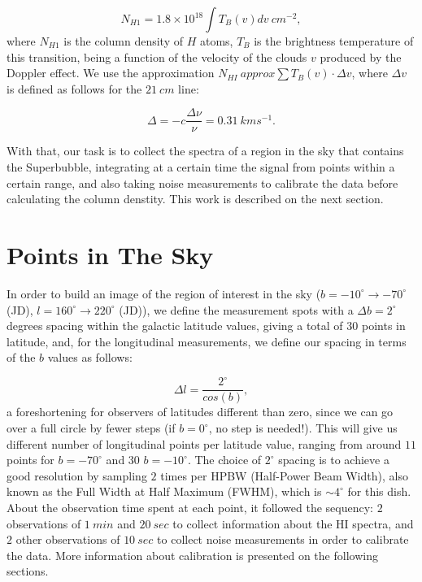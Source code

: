 \documentclass{article}
\begin{document}
\begin{equation}
N_{H1} = 1.8\times10^{18}\int T_{B}(v)dv \  cm^{-2},
\label{eq:tau}
\end{equation}  
where $N_{H1}$ is the column density of $H$ atoms, $T_{B}$ is the
brightness temperature of this transition, being a function of the
velocity of the clouds $v$ produced by the Doppler effect. We use the
approximation $ N_{HI} \ approx \sum T_{B}(v) \cdot \Delta v$, where
$\Delta v$ is defined as follows for the $21 \ cm$ line:

\begin{equation}
\Delta = -c\frac{\Delta \nu}{\nu} = 0.31 \ kms^{-1}.
\label{eq:tau}
\end{equation}  

With that, our task is to collect the spectra of a region in the sky
that contains the Superbubble, integrating at a certain time the signal
from points within a certain range, and also taking noise measurements
to calibrate the data before calculating the column denstity. This work
is described on the next section.

\section{Points in The Sky}

In order to build an image of the region of interest in the sky 
($b = -10^{\circ}  \rightarrow -70^{\circ}$ (JD), $l = 160  ^{\circ}
\rightarrow 220 ^{\circ}$ (JD)), we define the measurement spots with a
$\Delta b = 2^{\circ}$
degrees spacing within the galactic latitude values, giving a total of $30$
points in latitude, and, for the longitudinal measurements, we
define our spacing in terms of the $b$ values as follows:

\begin{equation}
\Delta l = \frac {2^{\circ}}{cos(b)},
\label{eq:tau}
\end{equation}  
a foreshortening for observers of latitudes different than zero, since
we can go over a full circle by fewer steps (if $b = 0^{\circ}$, no step
is needed!). This will give us different number of longitudinal 
points per latitude value, ranging from around $11$ points for $b = -70 ^{\circ}$
and $30$  $b = -10 ^{\circ}$. The choice of $2 ^{\circ}$ spacing is to achieve a good resolution by
sampling $2$ times per HPBW (Half-Power Beam Width), also known as the
Full Width at Half Maximum (FWHM), which is $\sim 4^{\circ}$ for this dish. About the observation 
time spent at each point, it followed the sequency: $2$ observations of $1 \ min$ and $20 \ sec$ 
to collect information about the HI spectra, and $2$ other observations of $10 \ sec$ to
collect noise measurements in order to calibrate the data. More information about calibration 
is presented on the following sections.
\end{document}
